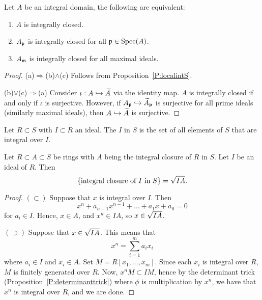 \documentclass{ximera}
\begin{document}
\begin{proposition}
  Let $A$ be an integral domain, the following are equivalent:
  \begin{enumerate}
  \item $A$ is integrally closed.
  \item $A_{\mathfrak{p}}$ is integrally closed for all $\mathfrak{p}\in\operatorname{Spec}(A)$.
  \item $A_{\mathfrak{m}}$ is integrally closed for all maximal ideals.
  \end{enumerate}
  \begin{proof}
    (a)$\Rightarrow$(b)$\wedge$(c) Follows from Proposition~\ref{P:localintS}.

    (b)$\vee$(c)$\Rightarrow$(a) Consider $\iota: A\hookrightarrow\widetilde{A}$ via
    the identity map. $A$ is integrally closed if and only if $\iota$
    is surjective. However, if $A_{\mathfrak{p}}\hookrightarrow\widetilde{A}_{\mathfrak{p}}$ is surjective
    for all prime ideals (similarly maximal ideals), then
    $A\hookrightarrow\widetilde{A}$ is surjective.
  \end{proof}
\end{proposition}


\begin{definition}
   Let $R\subset S$ with $I\subset R$ an ideal. The  $I$ in $S$ is the set of all elements of $S$
   that are integral over $I$.
\end{definition}


\begin{proposition}\label{P:intideal}
  Let $R\subset A\subset S$ be rings with $A$ being the integral
  closure of $R$ in $S$. Let $I$ be an ideal of $R$. Then
  \[
  \{\text{integral closure of $I$ in $S$}\} = \sqrt{IA}.
  \]
  \begin{proof}
    $(\subset)$ Suppose that $x$ is integral over $I$. Then
    \[
    x^n + a_{n-1}x^{n-1} + \dots + a_1 x + a_0 = 0
    \]
    for $a_i\in I$. Hence, $x\in A$, and $x^n\in IA$, so $x\in
    \sqrt{IA}$.

    $(\supset)$ Suppose that $x\in\sqrt{IA}$. This means that
    \[
    x^n = \sum_{i=1}^m a_i x_i
    \]
    where $a_i\in I$ and $x_i\in A$. Set $M = R[x_1,\dots,
      x_m]$. Since each $x_i$ is integral over $R$, $M$ is finitely
    generated over $R$. Now, $x^n M \subset I M$, hence by the
    determinant trick (Proposition~\ref{P:determinanttrick}) where
    $\phi$ is multiplication by $x^n$, we have that $x^n$ is integral
    over $R$, and we are done.
  \end{proof}
\end{proposition}
\end{document}
